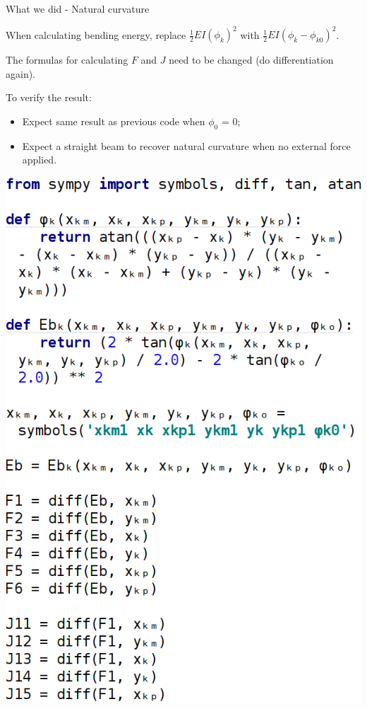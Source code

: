 \documentclass{beamer}
\newlength{\currentparskip}
\newenvironment{minipageparskip}[1]{\setlength{\currentparskip}{\parskip}\begin{minipage}{#1}\setlength{\parskip}{\currentparskip}}{\end{minipage}}
\begin{document}
	\begin{frame}{What we did - Natural curvature}
		\begin{minipageparskip}{0.5\textwidth}
			When calculating bending energy, replace $\frac12EI(\phi_k)^2$ with $\frac12EI(\phi_k - \phi_{k0})^2$.
			
			The formulas for calculating $F$ and $J$ need to be changed (do differentiation again).
			
			\footnotesize
			To verify the result:
			\begin{itemize}
				\item Expect same result as previous code when $\phi_0$ = 0;
				\item Expect a straight beam to recover natural curvature when no external force applied.
			\end{itemize}
		\end{minipageparskip}%
		\hspace{0.05\textwidth}%
		\begin{minipageparskip}{0.45\textwidth}
			\includegraphics[width=\textwidth]{res/diff.png}
		\end{minipageparskip}
	\end{frame}
\end{document}
